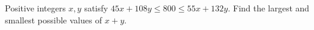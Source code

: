 Positive integers $x,y$ satisfy $45x+108y\le800\le55x+132y$. Find the largest and smallest possible values of $x+y$.
